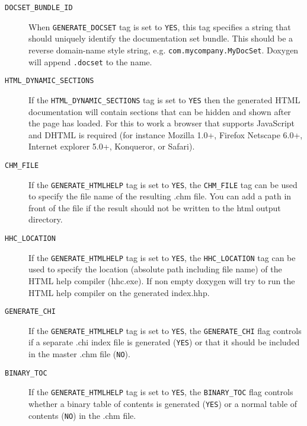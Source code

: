 \begin{description}
\label{config_cfg_docset_bundle_id}
\hypertarget{config_cfg_docset_bundle_id}{}
 \item[{\tt DOCSET\_\-BUNDLE\_\-ID} ]When {\tt GENERATE\_\-DOCSET} tag is set to {\tt YES}, this tag specifies a string that should uniquely identify the documentation set bundle. This should be a reverse domain-name style string, e.g. {\tt com.mycompany.MyDocSet}. Doxygen will append {\tt .docset} to the name.

\label{config_cfg_html_dynamic_sections}
\hypertarget{config_cfg_html_dynamic_sections}{}
 \item[{\tt HTML\_\-DYNAMIC\_\-SECTIONS} ] If the {\tt HTML\_\-DYNAMIC\_\-SECTIONS} tag is set to {\tt YES} then the generated HTML documentation will contain sections that can be hidden and shown after the page has loaded. For this to work a browser that supports JavaScript and DHTML is required (for instance Mozilla 1.0+, Firefox Netscape 6.0+, Internet explorer 5.0+, Konqueror, or Safari).

\label{config_cfg_chm_file}
\hypertarget{config_cfg_chm_file}{}
 \item[{\tt CHM\_\-FILE} ] If the {\tt GENERATE\_\-HTMLHELP} tag is set to {\tt YES}, the {\tt CHM\_\-FILE} tag can be used to specify the file name of the resulting .chm file. You can add a path in front of the file if the result should not be written to the html output directory.

\label{config_cfg_hhc_location}
\hypertarget{config_cfg_hhc_location}{}
 \item[{\tt HHC\_\-LOCATION} ] If the {\tt GENERATE\_\-HTMLHELP} tag is set to {\tt YES}, the {\tt HHC\_\-LOCATION} tag can be used to specify the location (absolute path including file name) of the HTML help compiler (hhc.exe). If non empty doxygen will try to run the HTML help compiler on the generated index.hhp.

\label{config_cfg_generate_chi}
\hypertarget{config_cfg_generate_chi}{}
 \item[{\tt GENERATE\_\-CHI} ] If the {\tt GENERATE\_\-HTMLHELP} tag is set to {\tt YES}, the {\tt GENERATE\_\-CHI} flag controls if a separate .chi index file is generated ({\tt YES}) or that it should be included in the master .chm file ({\tt NO}).

\label{config_cfg_binary_toc}
\hypertarget{config_cfg_binary_toc}{}
 \item[{\tt BINARY\_\-TOC} ] If the {\tt GENERATE\_\-HTMLHELP} tag is set to {\tt YES}, the {\tt BINARY\_\-TOC} flag controls whether a binary table of contents is generated ({\tt YES}) or a normal table of contents ({\tt NO}) in the .chm file.


\end{description}
